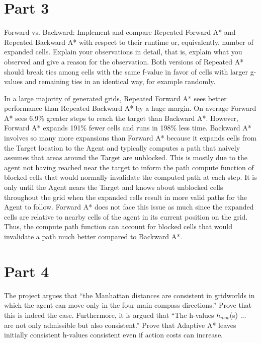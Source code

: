 \documentclass[12pt]{article}
\begin{document}
\section*{Part 3}
  \begin{itshape}
Forward vs. Backward: Implement and compare Repeated Forward A* and Repeated Backward A*
with respect to their runtime or, equivalently, number of expanded cells. Explain your observations in detail, that is, explain
what you observed and give a reason for the observation. Both versions of Repeated A* should break ties among cells with
the same f-value in favor of cells with larger g-values and remaining ties in an identical way, for example randomly.
  \end{itshape}
\begin {flushleft}
In a large majority of generated grids, Repeated Forward A* sees better performance than Repeated Backward A* by a huge margin. On average Forward A* sees 6.9\% greater steps to reach the target than Backward A*. However, Forward A* expands 191\% fewer cells and runs in 198\% less time. Backward A* involves so many more expansions than Forward A* because it expands cells from the Target location to the Agent and typically computes a path that naively assumes that areas around the Target are unblocked. This is mostly due to the agent not having reached near the target to inform the path compute function of blocked cells that would normally invalidate the computed path at each step. It is only until the Agent nears the Target and knows about unblocked cells throughout the grid when the expanded cells result in more valid paths for the Agent to follow. Forward A* does not face this issue as much since the expanded cells are relative to nearby cells of the agent in its current position on the grid. Thus, the compute path function can account for blocked cells that would invalidate a path much better compared to Backward A*.
\end{flushleft}
\section*{Part 4}

        \begin{itshape}
       The project argues that “the Manhattan distances are consistent in gridworlds in which the agent can move only in the four main compass directions.” Prove that this is indeed the case.
\vskip 0.5cm
Furthermore, it is argued that “The h-values 
$h_{new}$(s) ... are not only admissible but also consistent.” Prove that Adaptive A* leaves initially consistent h-values consistent even if action costs can increase.
         \end{itshape}
         
\end{document}
